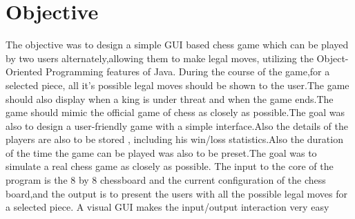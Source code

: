 \section{Objective}

The objective was to design a simple GUI based chess game which can be played by two users alternately,allowing them to make legal moves, utilizing the Object-Oriented Programming features of Java. During the course of the game,for a selected piece, all it's possible legal moves should be shown to the user.The game should also display when a king is under threat and when the game ends.The game should mimic the official game of chess as closely as possible.The goal was also to design a user-friendly game with a simple interface.Also the details of the players are also to be stored , including his win/loss statistics.Also the duration of the time the game can be played was also to be preset.The goal was to simulate a real chess game as closely as possible. The input to the core of the program is the 8 by 8 chessboard and the current configuration of the chess board,and the output is to present the users with all the possible legal moves for a selected piece. A visual GUI makes the input/output interaction very easy 